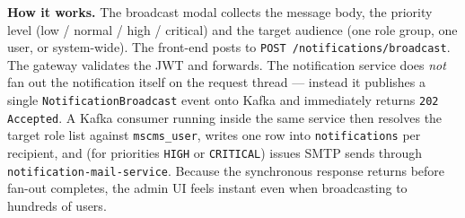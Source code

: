 \documentclass[12pt,a4paper,oneside]{report}
\begin{document}
\textbf{How it works.} The broadcast modal collects the message body,
the priority level (low / normal / high / critical) and the target
audience (one role group, one user, or system-wide). The front-end
posts to \texttt{POST /notifications/broadcast}. The gateway
validates the JWT and forwards. The notification service does
\emph{not} fan out the notification itself on the request thread —
instead it publishes a single \texttt{NotificationBroadcast} event
onto Kafka and immediately returns \texttt{202 Accepted}. A Kafka
consumer running inside the same service then resolves the target
role list against \texttt{mscms\_user}, writes one row into
\texttt{notifications} per recipient, and (for priorities
\texttt{HIGH} or \texttt{CRITICAL}) issues SMTP sends through
\texttt{notification-mail-service}. Because the synchronous response
returns before fan-out completes, the admin UI feels instant even
when broadcasting to hundreds of users.
\end{document}
